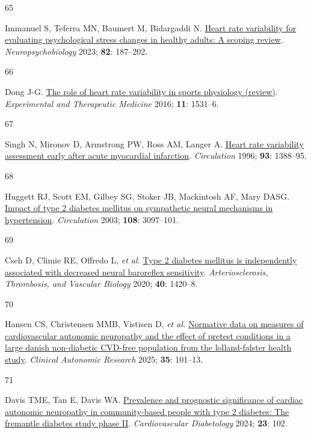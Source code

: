 \documentclass[
  a4paper,
  headsepline=true,
  open=any]{scrbook}
\newlength{\cslhangindent}
\newlength{\csllabelwidth}
\newlength{\cslentryspacingunit} %
\newenvironment{CSLReferences}[2] %
 {%
  \setlength{\parindent}{0pt}
  \ifodd #1
  \let\oldpar\par
  \def\par{\hangindent=\cslhangindent\oldpar}
  \fi
  \setlength{\parskip}{#2\cslentryspacingunit}
 }%
 {}
\newcommand{\CSLLeftMargin}[1]{\parbox[t]{\csllabelwidth}{#1}}
\newcommand{\CSLRightInline}[1]{\parbox[t]{\linewidth - \csllabelwidth}{#1}\break}
\begin{document}
\begin{CSLReferences}{0}{0}
\leavevmode{}%
\CSLLeftMargin{65 }%
\CSLRightInline{Immanuel S, Teferra MN, Baumert M, Bidargaddi N.
\href{https://doi.org/10.1159/000530376}{Heart rate variability for
evaluating psychological stress changes in healthy adults: A scoping
review}. \emph{Neuropsychobiology} 2023; \textbf{82}: 187--202.}

\leavevmode{}%
\CSLLeftMargin{66 }%
\CSLRightInline{Dong J-G.
\href{https://doi.org/10.3892/etm.2016.3104}{The role of heart rate
variability in sports physiology (review)}. \emph{Experimental and
Therapeutic Medicine} 2016; \textbf{11}: 1531--6.}

\leavevmode{}%
\CSLLeftMargin{67 }%
\CSLRightInline{Singh N, Mironov D, Armstrong PW, Ross AM, Langer A.
\href{https://doi.org/10.1161/01.CIR.93.7.1388}{Heart rate variability
assessment early after acute myocardial infarction}. \emph{Circulation}
1996; \textbf{93}: 1388--95.}

\leavevmode{}%
\CSLLeftMargin{68 }%
\CSLRightInline{Huggett RJ, Scott EM, Gilbey SG, Stoker JB, Mackintosh
AF, Mary DASG.
\href{https://doi.org/10.1161/01.CIR.0000103123.66264.FE}{Impact of type
2 diabetes mellitus on sympathetic neural mechanisms in hypertension}.
\emph{Circulation} 2003; \textbf{108}: 3097--101.}

\leavevmode{}%
\CSLLeftMargin{69 }%
\CSLRightInline{Cseh D, Climie RE, Offredo L, \emph{et al.}
\href{https://doi.org/10.1161/ATVBAHA.120.314102}{Type 2 diabetes
mellitus is independently associated with decreased neural baroreflex
sensitivity}. \emph{Arteriosclerosis, Thrombosis, and Vascular Biology}
2020; \textbf{40}: 1420--8.}

\leavevmode{}%
\CSLLeftMargin{70 }%
\CSLRightInline{Hansen CS, Christensen MMB, Vistisen D, \emph{et al.}
\href{https://doi.org/10.1007/s10286-024-01069-6}{Normative data on
measures of cardiovascular autonomic neuropathy and the effect of
pretest conditions in a large danish non-diabetic CVD-free population
from the lolland-falster health study}. \emph{Clinical Autonomic
Research} 2025; \textbf{35}: 101--13.}

\leavevmode{}%
\CSLLeftMargin{71 }%
\CSLRightInline{Davis TME, Tan E, Davis WA.
\href{https://doi.org/10.1186/s12933-024-02185-3}{Prevalence and
prognostic significance of cardiac autonomic neuropathy in
community-based people with type 2 diabetes: The fremantle diabetes
study phase II}. \emph{Cardiovascular Diabetology} 2024; \textbf{23}:
102.}


\end{CSLReferences}
\end{document}
